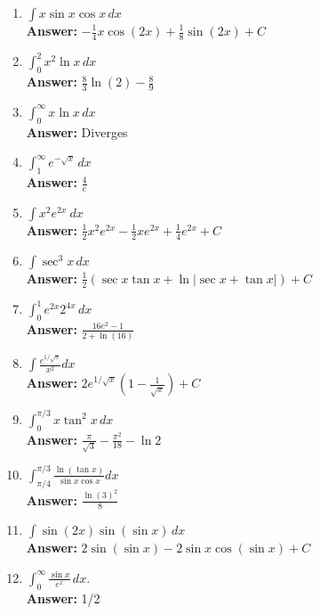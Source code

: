 \documentclass[letterpaper]{article}
\begin{document}
\begin{enumerate}
\begin{enumerate}
	\item $\int x \sin x \cos x\,dx$
	\\ \textbf{Answer:} $-\frac{1}{4} x \cos(2 x)+\frac{1}{8} \sin(2 x)+C$

	\item $\int_0^2 x^2 \ln x\,dx$
	\\ \textbf{Answer:} $\frac{8}{3}\ln(2)-\frac{8}{9}$

	\item $\int_0^\infty x\ln x\,dx$
	\\ \textbf{Answer:} Diverges

	\item $\int_1^\infty e^{-\sqrt x}\,dx$
	\\ \textbf{Answer:} $\frac{4}{e}$

	\item $\int x^2 e^{2x}~dx$
	\\ \textbf{Answer:} $\frac12 x^2 e^{2x}- \frac12xe^{2x}+\frac14e^{2x}+C$

	\item $\int \sec^3 x\,dx$
	\\ \textbf{Answer:} $\frac{1}{2}\left(\sec x \tan x + \ln | \sec x + \tan x| \right)+C$

	\item $\int_0^1 e^{2x}2^{4x}\,dx$
	\\ \textbf{Answer:} $\frac{16e^2-1}{2+\ln(16)}$

	\item $\int \frac{e^{1/\sqrt{x}}}{x^2}dx$
	\\ \textbf{Answer:} $2e^{1/\sqrt{x}}\left(1-\frac{1}{\sqrt x}\right)+C$

	\item $\int_0^{\pi/3} x\tan^2 x\,dx$
	\\ \textbf{Answer:} $\frac{\pi}{\sqrt{3}}-\frac{\pi^2}{18}-\ln 2$

	\item $\int_{\pi/4}^{\pi/3} \frac{\ln(\tan x)}{\sin x \cos x}dx$
	\\ \textbf{Answer:} $\frac{\ln(3)^2}{8}$

	\item $\int \sin(2x)\sin(\sin x)\,dx$
	\\ \textbf{Answer:} $2\sin(\sin x)-2\sin x\cos(\sin x)+C$

	\item $\int_0^\infty \frac{\sin x}{e^x}\,dx$.
	\\ \textbf{Answer:} 1/2
	\end{enumerate}


\end{enumerate}
\end{document}
